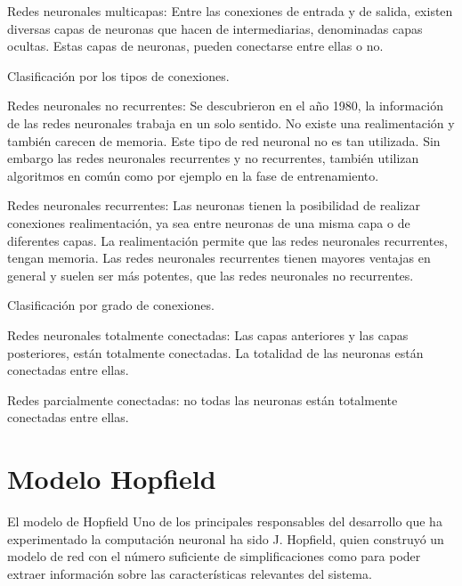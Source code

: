 \documentclass[letterpaper,12pt]{article}
\begin{document}
Redes neuronales multicapas:\newline
Entre las conexiones de entrada y de salida, existen diversas capas de neuronas que hacen de intermediarias, denominadas capas ocultas. Estas capas de neuronas, pueden conectarse entre ellas o no.\newline

Clasificación por los tipos de conexiones.\newline

Redes neuronales no recurrentes:\newline
Se descubrieron en el año 1980, la información de las redes neuronales trabaja en un solo sentido. No existe una realimentación y también carecen de memoria. Este tipo de red neuronal no es tan utilizada. Sin embargo las redes neuronales recurrentes y no recurrentes, también utilizan algoritmos en común como por ejemplo en la fase de entrenamiento.\newline

Redes neuronales recurrentes:\newline
Las neuronas tienen la posibilidad de realizar conexiones realimentación, ya sea entre neuronas de una misma capa o de diferentes capas. La realimentación permite que las redes neuronales recurrentes, tengan memoria. Las redes neuronales recurrentes tienen mayores ventajas en general y suelen ser más potentes, que las redes neuronales no recurrentes.\newline


Clasificación por grado de conexiones.\newline

Redes neuronales totalmente conectadas:\newline
Las capas anteriores y las capas posteriores, están totalmente conectadas. La totalidad de las neuronas están conectadas entre ellas.

Redes parcialmente conectadas: no todas las neuronas están totalmente conectadas entre ellas.\newline

\newpage

\section{Modelo Hopfield}
El modelo de Hopfield
Uno de los principales responsables del desarrollo que ha experimentado la computación neuronal ha sido J. Hopfield, quien construyó un modelo de red con el número suficiente de simplificaciones como para poder extraer información sobre las características relevantes del sistema.
\end{document}
